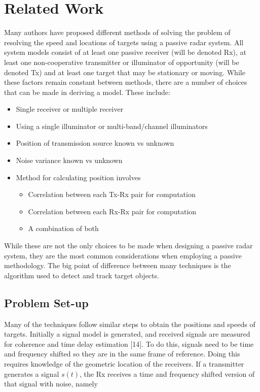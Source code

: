 \documentclass[12pt,openany,a4paper]{book}
\begin{document}
\section{Related Work}

Many authors have proposed different methods of solving the problem of resolving the speed and locations of targets using a passive radar system. All system models consist of at least one passive receiver (will be denoted Rx), at least one non-cooperative transmitter or illuminator of opportunity (will be denoted Tx) and at least one target that may be stationary or moving. While these factors remain constant between methods, there are a number of choices that can be made in deriving a model. These include:

\begin{itemize}
\item{Single receiver or multiple receiver}
\item{Using a single illuminator or multi-band/channel illuminators}
\item{Position of transmission source known vs unknown}
\item{Noise variance known vs unknown}
\item{Method for calculating position involves}
	\begin{itemize}
	\item{Correlation between each Tx-Rx pair for computation}
	\item{Correlation between each Rx-Rx pair for computation}
	\item{A combination of both}
	\end{itemize}
\end{itemize}

While these are not the only choices to be made when designing a passive radar system, they are the most common considerations when employing a passive methodology. The big point of difference between many techniques is the algorithm used to detect and track target objects.

\subsection{Problem Set-up}

Many of the techniques follow similar steps to obtain the positions and speeds of targets. Initially a signal model is generated, and received signals are measured for coherence and time delay estimation [14]. To do this, signals need to be time and frequency shifted so they are in the same frame of reference. Doing this requires knowledge of the geometric location of the receivers. If a transmitter generates a signal $s(t)$, the Rx receives a time and frequency shifted version of that signal with noise, namely
\end{document}
